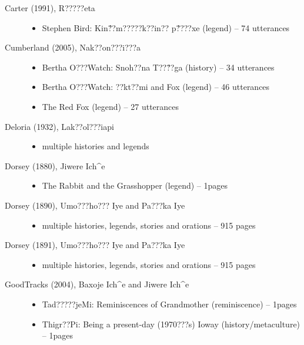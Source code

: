 \documentclass[output=paper]{LSP/langsci}
\begin{document}
\begin{description}

\item[Carter (1991), R?????eta]\hfill
\begin{itemize}
\item Stephen Bird: Kin\'??m?????k??in?? p\'????xe (legend) -- 74 utterances
\end{itemize}

\item[Cumberland (2005), Nak??on???i???a]\hfill
\begin{itemize}
\item Bertha O???Watch: Snoh??na T??\'??ga (history) -- 34 utterances
\item Bertha O???Watch: ??kt??mi and Fox (legend) -- 46 utterances
\item The Red Fox (legend) -- 27 utterances
\end{itemize}

\item[Deloria (1932), Lak??ol???iapi]\hfill
\begin{itemize}
\item multiple histories and legends
\end{itemize}

\item[Dorsey (1880), Jiwere Ich\^{}e]\hfill
\begin{itemize}
\item The Rabbit and the Grasshopper (legend) -- 1\textonehalf{}pages
\end{itemize}

\item[Dorsey (1890), Umo???ho??? Iye and Pa???ka Iye]\hfill
\begin{itemize}
\item multiple histories, legends, stories and orations -- 915 pages
\end{itemize}

\item[Dorsey (1891), Umo???ho??? Iye and Pa???ka Iye]\hfill
\begin{itemize}
\item multiple histories, legends, stories and orations -- 915 pages
\end{itemize}

\item[GoodTracks (2004), Baxoje Ich\^{}e and Jiwere Ich\^{}e]\hfill
\begin{itemize}
\item Tad?????jeMi: Reminiscences of Grandmother (reminiscence) -- 1\textonehalf{}pages
\item Thigr??Pi: Being a present-day (1970???s) Ioway (history/metaculture) -- 1\textonehalf{}pages
\end{itemize}


\end{description}
\end{document}
